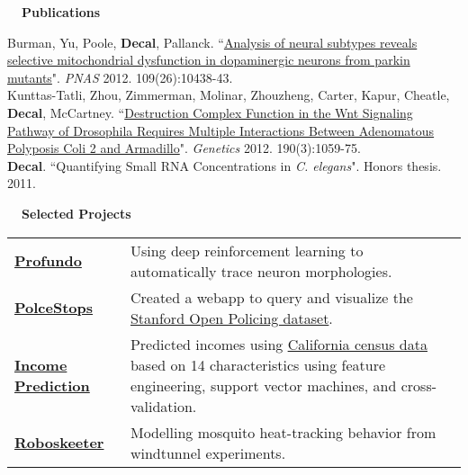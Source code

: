 \documentclass[a4paper,12pt]{article}
\newcommand{\resheading}[1]{{\vspace*{.001in} \colorbox{mygrey}{\begin{minipage}{\textwidth}{\textmd{\large \textbf{#1} \vphantom{p\^{E}}}}\end{minipage}}} }
\newcommand{\tabitem}{~~\llap{\textbullet}~~}
\begin{document}
\resheading{~~Publications}

      Burman, Yu, Poole, \textbf{Decal}, Pallanck. ``\href{http://www.pnas.org/content/early/2012/06/12/1120688109}{Analysis of neural subtypes reveals selective mitochondrial dysfunction in dopaminergic neurons from parkin mutants}". \textit{PNAS} 2012. 109(26):10438-43.\\
      Kunttas-Tatli, Zhou, Zimmerman, Molinar, Zhouzheng, Carter, Kapur, Cheatle, \textbf{Decal}, McCartney. ``\href{http://www.genetics.org/content/190/3/1059.full}{Destruction Complex Function in the Wnt Signaling Pathway of Drosophila Requires Multiple Interactions Between Adenomatous Polyposis Coli 2 and Armadillo}". \textit{Genetics} 2012. 190(3):1059-75.\\
      \textbf{\textbf{Decal}}. ``Quantifying Small RNA Concentrations in \textit{C. elegans}". Honors thesis. 2011.\\

      \resheading{~~Selected Projects}
      \vspace{-1em}
      \setlength{\extrarowheight}{.5em}
      \begin{tabularx}{\textwidth}{p{3cm}>{\arraybackslash}X}

\bfseries{\href{https://github.com/Vaa3D/vaa3d_tools/tree/master/hackathon/profundo}{Profundo}} & Using deep reinforcement learning to automatically trace neuron morphologies.\\

      \bfseries{\href{https://github.com/ncf-ds/police-traffic-stop-explorer}{PolceStops}} & Created a webapp to query and visualize the \href{https://openpolicing.stanford.edu/data/}{Stanford Open Policing dataset}.\\

      \bfseries{\href{https://github.com/crypdick/predict-donors-California-census}{Income \mbox{Prediction}}} & Predicted incomes using \href{https://www.aaai.org/Papers/KDD/1996/KDD96-033.pdf}{California census data} based on 14 characteristics using feature engineering, support vector machines, and cross-validation.\\

      \bfseries{\href{https://github.com/crypdick/RoboSkeeter}{Roboskeeter}} &  Modelling mosquito heat-tracking behavior from windtunnel experiments.
      \end{tabularx}
\end{document}
